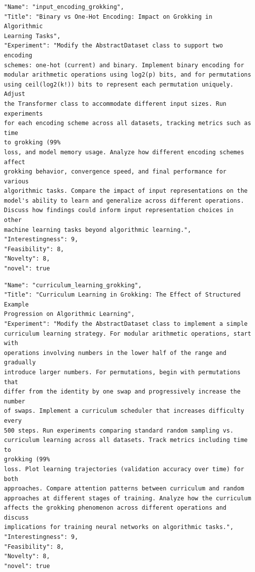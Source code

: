 \documentclass[11pt, a4paper]{include/gdm_format}
\begin{document}
\begin{tcolorbox}[breakable,colback=blue!5!white, colframe=blue!75!black, title=Idea 7/50 - \texttt{input\_encoding\_grokking}]
\small
\begin{verbatim}
"Name": "input_encoding_grokking",
"Title": "Binary vs One-Hot Encoding: Impact on Grokking in Algorithmic
Learning Tasks",
"Experiment": "Modify the AbstractDataset class to support two encoding
schemes: one-hot (current) and binary. Implement binary encoding for
modular arithmetic operations using log2(p) bits, and for permutations
using ceil(log2(k!)) bits to represent each permutation uniquely. Adjust
the Transformer class to accommodate different input sizes. Run experiments
for each encoding scheme across all datasets, tracking metrics such as time
to grokking (99%
loss, and model memory usage. Analyze how different encoding schemes affect
grokking behavior, convergence speed, and final performance for various
algorithmic tasks. Compare the impact of input representations on the
model's ability to learn and generalize across different operations.
Discuss how findings could inform input representation choices in other
machine learning tasks beyond algorithmic learning.",
"Interestingness": 9,
"Feasibility": 8,
"Novelty": 8,
"novel": true
\end{verbatim}
\end{tcolorbox}

\begin{tcolorbox}[breakable,colback=blue!5!white, colframe=blue!75!black, title=Idea 8/50 - \texttt{curriculum\_learning\_grokking}]
\small
\begin{verbatim}
"Name": "curriculum_learning_grokking",
"Title": "Curriculum Learning in Grokking: The Effect of Structured Example
Progression on Algorithmic Learning",
"Experiment": "Modify the AbstractDataset class to implement a simple
curriculum learning strategy. For modular arithmetic operations, start with
operations involving numbers in the lower half of the range and gradually
introduce larger numbers. For permutations, begin with permutations that
differ from the identity by one swap and progressively increase the number
of swaps. Implement a curriculum scheduler that increases difficulty every
500 steps. Run experiments comparing standard random sampling vs.
curriculum learning across all datasets. Track metrics including time to
grokking (99%
loss. Plot learning trajectories (validation accuracy over time) for both
approaches. Compare attention patterns between curriculum and random
approaches at different stages of training. Analyze how the curriculum
affects the grokking phenomenon across different operations and discuss
implications for training neural networks on algorithmic tasks.",
"Interestingness": 9,
"Feasibility": 8,
"Novelty": 8,
"novel": true
\end{verbatim}
\end{tcolorbox}
\end{document}
